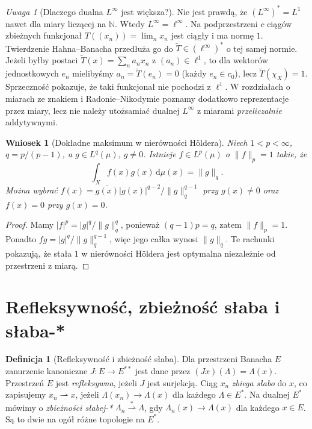 \documentclass[11pt,a4paper,oneside]{book}
\numberwithin{equation}{chapter}
\theoremstyle{plain}
\newtheorem{wniosek}[twierdzenie]{Wniosek}
\theoremstyle{definition}
\newtheorem{definicja}[twierdzenie]{Definicja}
\theoremstyle{remark}
\newtheorem{uwaga}[twierdzenie]{Uwaga}
\begin{document}
\begin{uwaga}[Dlaczego dualna $L^\infty$ jest większa?]
Nie jest prawdą, że $(L^\infty)^*=L^1$ nawet dla
miary liczącej na $\mathbb N$. Wtedy $L^\infty=\ell^\infty$.
Na podprzestrzeni $c$ ciągów zbieżnych funkcjonał
$T((x_n))=\lim_nx_n$ jest ciągły i ma normę $1$.
Twierdzenie Hahna--Banacha przedłuża go do
$\widetilde T\in(\ell^\infty)^*$ o tej samej normie.
Jeżeli byłby postaci $\widetilde T(x)=\sum_n a_nx_n$
z $(a_n)\in\ell^1$, to dla wektorów jednostkowych $e_n$
mielibyśmy $a_n=\widetilde T(e_n)=0$ (każdy $e_n\in c_0$),
lecz $\widetilde T(\chi_X)=1$. Sprzeczność pokazuje,
że taki funkcjonał nie pochodzi z $\ell^1$.
W rozdziałach o miarach ze znakiem i Radonie--Nikodymie
poznamy dodatkowo reprezentacje przez miary, lecz nie
należy utożsamiać dualnej $L^\infty$ z miarami
\emph{przeliczalnie} addytywnymi.
\end{uwaga}

\begin{wniosek}[Dokładne maksimum w nierówności Höldera]
\label{cor:holder-sharp-15}
Niech $1<p<\infty$, $q=p/(p-1)$, a
$g\in L^q(\mu)$, $g\neq0$. Istnieje
$f\in L^p(\mu)$ o $\|f\|_p=1$ takie, że
\[
\int_X f(x)g(x)\,\mathrm d\mu(x)=\|g\|_q.
\]
Można wybrać
$f(x)=\overline{g(x)}|g(x)|^{q-2}/\|g\|_q^{q-1}$
przy $g(x)\neq0$ oraz $f(x)=0$ przy $g(x)=0$.
\end{wniosek}
\begin{proof}
Mamy $|f|^p=|g|^q/\|g\|_q^q$,
ponieważ $(q-1)p=q$, zatem $\|f\|_p=1$.
Ponadto $fg=|g|^q/\|g\|_q^{q-1}$, więc
jego całka wynosi $\|g\|_q$. Te rachunki
pokazują, że stała $1$ w nierówności Höldera
jest optymalna niezależnie od przestrzeni z miarą.
\end{proof}

\section{Refleksywność, zbieżność słaba i słaba-*}
\begin{definicja}[Refleksywność i zbieżność słaba]
\label{def:weak-lp-15}
Dla przestrzeni Banacha $E$ zanurzenie kanoniczne
$J:E\to E^{**}$ jest dane przez $(Jx)(\Lambda)=\Lambda(x)$.
Przestrzeń $E$ jest \emph{refleksywna}, jeżeli $J$ jest
surjekcją. Ciąg $x_n$ \emph{zbiega słabo} do $x$,
co zapisujemy $x_n\rightharpoonup x$, jeżeli
$\Lambda(x_n)\to\Lambda(x)$ dla każdego $\Lambda\in E^*$.
Na dualnej $E^*$ mówimy o \emph{zbieżności słabej-*}
$\Lambda_n\overset{*}{\rightharpoonup}\Lambda$,
gdy $\Lambda_n(x)\to\Lambda(x)$ dla każdego $x\in E$.
Są to dwie na ogół różne topologie na $E^*$.
\end{definicja}
\end{document}
